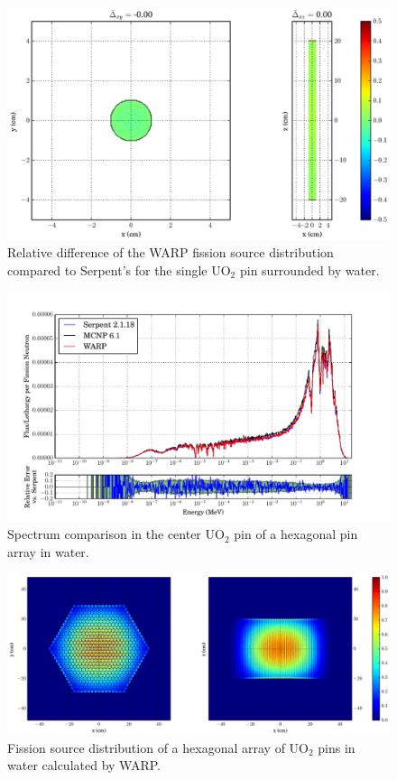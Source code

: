 \begin{figure}[h!]
\centering
\includegraphics[width=\textwidth,trim= 11cm 0cm 6cm 0cm]{graphics/finalresults/pincell_fiss_diff-6.eps}
\caption{Relative difference of the WARP fission source distribution compared to Serpent's for the single UO$_2$ pin surrounded by water. \label{pincell_fiss_diff} }
\end{figure}

\begin{figure}[h!] 
\centering
\includegraphics[width=\textwidth,trim= 1cm 0cm 1cm 0cm]{graphics/finalresults/assembly_spec-6.pdf}
\caption{Spectrum comparison in the center UO$_2$ pin of a hexagonal pin array in water. \label{assembly_spec} }
\end{figure}

\begin{figure}[h!]
\centering
\includegraphics[width=\textwidth,trim= 4cm 0cm 6cm 0cm]{graphics/finalresults/assembly_fiss-6.eps}
\caption{Fission source distribution of a hexagonal array of UO$_2$ pins in water calculated by WARP. \label{assembly_fiss} }
\end{figure}

